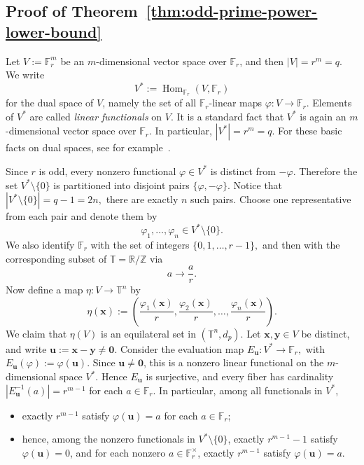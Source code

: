 \documentclass[11pt]{article}
\theoremstyle{definition}
\newcommand{\T}{\mathbb T}
\begin{document}
\subsection{Proof of Theorem~\ref{thm:odd-prime-power-lower-bound}}
Let \( V:=\mathbb{F}_r^m\) be an $m$-dimensional vector space over $\mathbb{F}_r$, and then \( |V|=r^m=q. \)
We write
\[
V^*:=\operatorname{Hom}_{\mathbb F_r}(V,\mathbb F_r)
\]
for the dual space of $V$, namely the set of all $\mathbb F_r$-linear maps
\(
\varphi:V\to \mathbb F_r.
\)
Elements of $V^*$ are called \emph{linear functionals} on $V$. It is a standard fact that $V^*$ is again an $m$-dimensional vector space over $\mathbb F_r$.
In particular,
\(
|V^*|=r^m=q.
\)
For these basic facts on dual spaces, see for example~\cite{Roman2008}.

Since $r$ is odd, every nonzero functional $\varphi\in V^*$ is distinct from $-\varphi$.
Therefore the set $V^*\setminus\{0\}$ is partitioned into disjoint pairs \( \{\varphi,-\varphi\}.\)
Notice that \( |V^*\setminus\{0\}|=q-1=2n, \)
there are exactly $n$ such pairs.
Choose one representative from each pair and denote them by
\[
\varphi_1,\dots,\varphi_n\in V^*\setminus\{0\}.
\]
We also identify $\mathbb F_r$ with the set of integers
\(
\{0,1,\dots,r-1\},
\)
and then with the corresponding subset of $\T=\mathbb R/\mathbb Z$ via
\[
a\rightarrow \frac{a}{r}.
\]
Now define a map
\(
\eta:V\to \T^n
\)
by
\[
\eta(\boldsymbol{x})
:=
\left(
\frac{\varphi_1(\boldsymbol{x})}{r},
\frac{\varphi_2(\boldsymbol{x})}{r},
\dots,
\frac{\varphi_n(\boldsymbol{x})}{r}
\right).
\]
We claim that $\eta(V)$ is an equilateral set in $(\T^n,d_p)$.
Let $\boldsymbol{x},\boldsymbol{y}\in V$ be distinct, and write
\(
\boldsymbol{u}:=\boldsymbol{x}-\boldsymbol{y}\neq \boldsymbol{0}.
\)
Consider the evaluation map
\(
E_{\boldsymbol{u}}:V^*\to \mathbb F_r,
\)
with
\(
E_{\boldsymbol{u}}(\varphi):=\varphi(\boldsymbol{u}).
\)
Since $\boldsymbol{u}\neq \boldsymbol{0}$, this is a nonzero linear functional on the $m$-dimensional space $V^*$.
Hence $E_{\boldsymbol{u}}$ is surjective, and every fiber has cardinality
\(
|E_{\boldsymbol{u}}^{-1}(a)|=r^{m-1}
\)
for each \(a\in\mathbb F_r.\) In particular, among all functionals in $V^*$,
\begin{itemize}
\item exactly $r^{m-1}$ satisfy $\varphi(\boldsymbol{u})=a$ for each $a\in\mathbb F_r$;
\item hence, among the nonzero functionals in $V^*\setminus\{0\}$, exactly $r^{m-1}-1$ satisfy $\varphi(\boldsymbol{u})=0$, and for each nonzero $a\in\mathbb F_r^\times$, exactly $r^{m-1}$ satisfy $\varphi(\boldsymbol{u})=a$.
\end{itemize}
\end{document}
